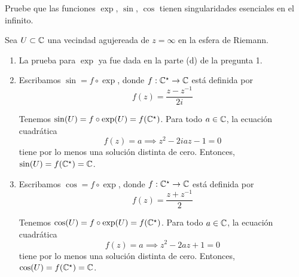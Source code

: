 \begin{exercise}
Pruebe que las funciones $\exp$, $\sin$, $\cos$ tienen singularidades esenciales en el infinito.
\end{exercise}

\begin{solution}
Sea $U \subset \mathbb C$ una vecindad agujereada de $z = \infty$ en la esfera de Riemann.

\begin{enumerate}[label=(\alph*)]
    \item La prueba para $\exp$ ya fue dada en la parte (d) de la pregunta 1.
    
    \item Escribamos $\sin = f \circ \exp$, donde $f : \mathbb C^\star \to \mathbb C$ está definida por
    $$f(z) = \frac {z - z^{-1}} {2i}$$
    
    Tenemos $\sin(U) = f \circ \exp(U) = f(\mathbb C^\star)$. Para todo $a \in \mathbb C$, la ecuación cuadrática
    $$f(z) = a \implies z^2 - 2iaz - 1 = 0$$
    tiene por lo menos una solución distinta de cero. Entonces, $\sin(U) = f(\mathbb C^\star) = \mathbb C$.
    
    \item Escribamos $\cos = f \circ \exp$, donde $f : \mathbb C^\star \to \mathbb C$ está definida por
    $$f(z) = \frac {z + z^{-1}} 2$$
    
    Tenemos $\cos(U) = f \circ \exp(U) = f(\mathbb C^\star)$. Para todo $a \in \mathbb C$, la ecuación cuadrática
    $$f(z) = a \implies z^2 - 2az + 1 = 0$$
    tiene por lo menos una solución distinta de cero. Entonces, $\cos(U) = f(\mathbb C^\star) = \mathbb C$.
\end{enumerate}
\end{solution}
